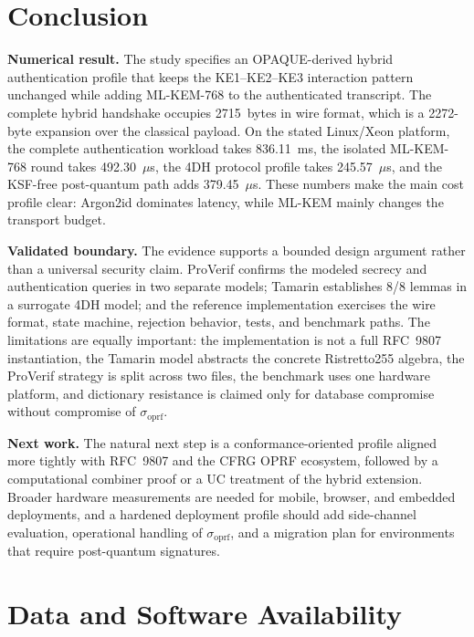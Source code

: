 \documentclass[preprint,12pt]{elsarticle}
\newcommand{\sigoprf}{\sigma_{\mathrm{oprf}}}
\theoremstyle{remark}
\begin{document}
\section{Conclusion}

\textbf{Numerical result.} The study specifies an OPAQUE-derived hybrid
authentication profile that keeps the KE1--KE2--KE3 interaction pattern
unchanged while adding ML-KEM-768 to the authenticated transcript. The
complete hybrid handshake occupies 2715~bytes in wire format, which is a
2272-byte expansion over the classical payload. On the stated Linux/Xeon
platform, the complete authentication workload takes 836.11~ms, the
isolated ML-KEM-768 round takes 492.30~$\mu$s, the 4DH protocol profile
takes 245.57~$\mu$s, and the KSF-free post-quantum path adds
379.45~$\mu$s. These numbers make the main cost profile clear: Argon2id
dominates latency, while ML-KEM mainly changes the transport budget.

\textbf{Validated boundary.} The evidence supports a bounded design
argument rather than a universal security claim. ProVerif confirms the
modeled secrecy and authentication queries in two separate models;
Tamarin establishes 8/8 lemmas in a surrogate 4DH model; and the
reference implementation exercises the wire format, state machine,
rejection behavior, tests, and benchmark paths. The limitations are
equally important: the implementation is not a full RFC~9807
instantiation, the Tamarin model abstracts the concrete Ristretto255
algebra, the ProVerif strategy is split across two files, the benchmark
uses one hardware platform, and dictionary resistance is claimed only
for database compromise without compromise of $\sigoprf$.

\textbf{Next work.} The natural next step is a conformance-oriented
profile aligned more tightly with RFC~9807 and the CFRG OPRF ecosystem,
followed by a computational combiner proof or a UC treatment of the
hybrid extension. Broader hardware measurements are needed for mobile,
browser, and embedded deployments, and a hardened deployment profile
should add side-channel evaluation, operational handling of $\sigoprf$,
and a migration plan for environments that require post-quantum
signatures.

\section*{Data and Software Availability}
\end{document}
